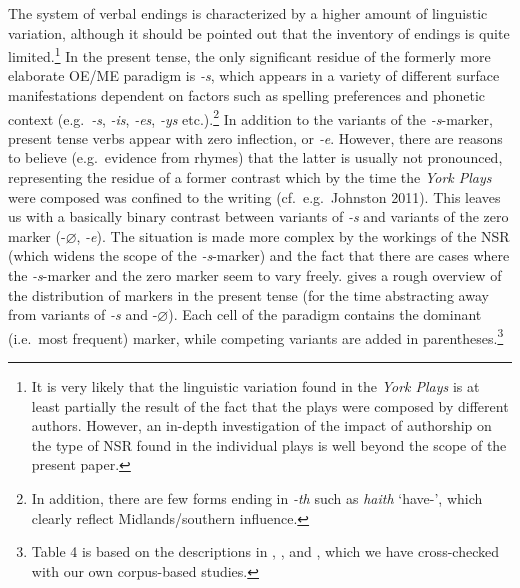 \documentclass[output=paper]{langsci/langscibook}
\begin{document}
The system of verbal  endings is characterized by a higher
amount of linguistic variation, although it should be pointed out that the
inventory of endings is quite limited.\footnote{It is very likely that the
linguistic variation found in the \emph{York Plays} is at least partially the
result of the fact that the plays were composed by different authors. However,
an in-depth investigation of the impact of authorship on the type of
\gls{NSR} found in the individual plays is well
beyond the scope of the present paper.} In the present tense, the only
significant residue of the formerly more elaborate \gls{OE}/ME 
paradigm is \emph{-s}, which appears in a variety of different surface
manifestations dependent on factors such as spelling preferences and phonetic
context (e.g.~\emph{-s}, \emph{-is}, \emph{-es}, \emph{-ys} etc.).\footnote{In
addition, there are few \Tsg{} forms ending in \emph{-th} such as \emph{haith}
`have-\Tsg{}', which clearly reflect Midlands/southern influence.} In addition
to the variants of the \emph{-s}-marker, present tense verbs appear with zero
inflection, or \emph{‑e}. However, there are reasons to believe (e.g.\ evidence
from rhymes) that the latter is usually not pronounced, representing the
residue of a former contrast which by the time the \emph{York Plays} were
composed was confined to the writing (cf.\ e.g.\ Johnston 2011). This leaves us
with a basically binary contrast between variants of \emph{-s} and variants of
the zero marker (-$\varnothing$, \emph{-e}). The situation is made more complex
by the workings of the \gls{NSR} (which widens the
scope of the \emph{-s}-marker) and the fact that there are cases where the
\emph{-s}-marker and the zero marker seem to vary freely. 
gives a rough overview of the distribution of markers in the present tense (for
the time abstracting away from variants of \emph{-s} and -$\varnothing$). Each
cell of the paradigm contains the dominant (i.e.\ most frequent) marker, while
competing variants are added in parentheses.\footnote{Table 4 is based on the
descriptions in \cite[lxxii]{Smith:1885}, \cite[272]{BurrowTurville-Petre:2005},
and \cite{Johnston:2011}, which we have cross-checked with our own corpus-based
studies.}
\end{document}
